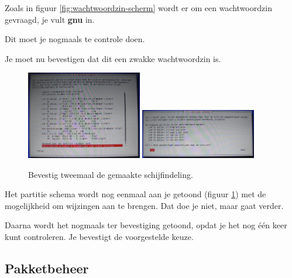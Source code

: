 \documentclass[12pt,a4paper]{article}
\begin{document}
Zoals in figuur \ref{fig:wachtwoordzin-scherm} wordt er om een wachtwoordzin gevraagd, je vult \textbf{gnu} in.

Dit moet je nogmaals te controle doen.

Je moet nu bevestigen dat dit een zwakke wachtwoordzin is. 

\begin{figure}[H]
\centering
\includegraphics[width=0.45\textwidth]{schijven-overzicht-scherm}
\includegraphics[width=0.45\textwidth]{schijven-tweede-overzicht-scherm}
\caption{Bevestig tweemaal de gemaakte schijfindeling.}
\label{fig:schijven-overzicht}
\end{figure}


Het partitie schema wordt nog eenmaal aan je getoond (figuur \ref{fig:schijven-overzicht}) met de mogelijkheid om wijzingen aan te brengen. Dat doe je niet, maar gaat verder.

Daarna wordt het nogmaals ter bevestiging getoond, opdat je het nog \'{e}\'{e}n keer kunt controleren. Je bevestigt de voorgestelde keuze.


\subsection{Pakketbeheer}
\end{document}
